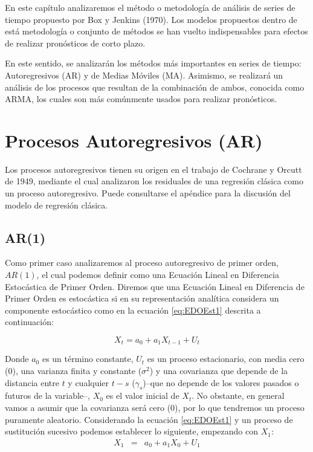 \documentclass[
]{book}
\begin{document}
En este capítulo analizaremos el método o metodología de análisis de
series de tiempo propuesto por Box y Jenkins (1970). Los modelos
propuestos dentro de está metodología o conjunto de métodos se han
vuelto indispensables para efectos de realizar pronósticos de corto
plazo.

En este sentido, se analizarán los métodos más importantes en series de
tiempo: Autoregresivos (AR) y de Medias Móviles (MA). Asimismo, se
realizará un análisis de los procesos que resultan de la combinación de
ambos, conocida como ARMA, los cuales son más comúnmente usados para
realizar pronósticos.

\hypertarget{procesos-autoregresivos-ar}{%
\section{Procesos Autoregresivos (AR)}\label{procesos-autoregresivos-ar}}

Los procesos autoregresivos tienen su origen en el trabajo de Cochrane y
Orcutt de 1949, mediante el cual analizaron los residuales de una
regresión clásica como un proceso autoregresivo. Puede consultarse el
apéndice para la discusión del modelo de regresión clásica.

\hypertarget{ar1}{%
\subsection{AR(1)}\label{ar1}}

Como primer caso analizaremos al proceso autoregresivo de primer orden,
\(AR(1)\), el cual podemos definir como una Ecuación Lineal en Diferencia
Estocástica de Primer Orden. Diremos que una Ecuación Lineal en
Diferencia de Primer Orden es estocástica si en su representación
analítica considera un componente estocástico como en la ecuación
\eqref{eq:EDOEst1} descrita a continuación:

\begin{equation}
    X_t = a_0 + a_1 X_{t-1} + U_t
\label{eq:EDOEst1}
\end{equation}

Donde \(a_0\) es un término constante, \(U_t\) es un proceso estacionario,
con media cero (0), una varianza finita y constante (\(\sigma^2\)) y una
covarianza que depende de la distancia entre \(t\) y cualquier \(t-s\)
(\(\gamma_s\))--que no depende de los valores pasados o futuros de la
variable--, \(X_0\) es el valor inicial de \(X_t\). No obstante, en general
vamos a asumir que la covarianza será cero (0), por lo que tendremos un
proceso puramente aleatorio. Considerando la ecuación \eqref{eq:EDOEst1} y
un proceso de sustitución sucesivo podemos establecer lo siguiente,
empezando con \(X_1\): \begin{eqnarray*}
    X_{1} & = & a_0 + a_1 X_{0} + U_{1}
\end{eqnarray*}
\end{document}
